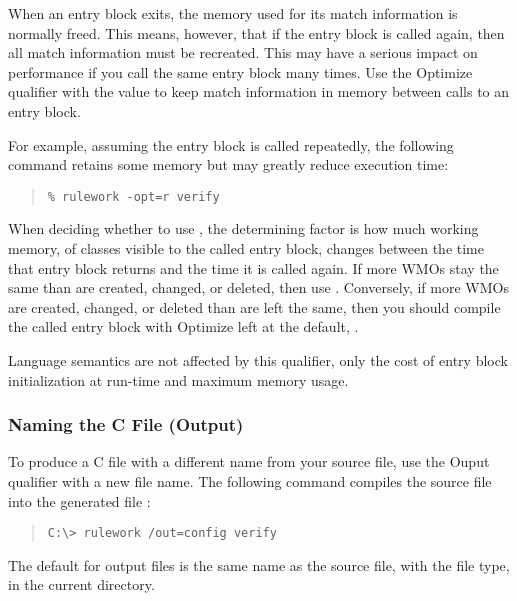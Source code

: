When an entry block exits, the memory used for its match information
is normally freed. This means, however, that if the entry block is
called again, then all match information must be recreated. This may
have a serious impact on performance if you call the same entry block
many times. Use the Optimize qualifier with the 
value to keep match information in memory between calls to an entry
block.

For example, assuming the entry block  is called
repeatedly, the following command retains some memory but
may greatly reduce execution time:

\begin{quote}
\begin{verbatim}
% rulework -opt=r verify
\end{verbatim}
\end{quote}

When deciding whether to use , the determining factor
is how much working memory, of classes visible to the called entry
block, changes between the time that entry block returns and the time
it is called again. If more WMOs stay the same than are created,
changed, or deleted, then use . Conversely, if more WMOs
are created, changed, or deleted than are left the same, then you
should compile the called entry block with Optimize left at the
default, .

\begin{note}
  Language semantics are not affected by this qualifier, only the cost
  of entry block initialization at run-time and maximum memory usage.
\end{note}

\subsubsection{Naming the C File (Output)}

To produce a C file with a different name from your source file, use
the Ouput qualifier with a new file name. The following command
compiles the source file  into the generated file
:

\begin{quote}
\begin{verbatim}
C:\> rulework /out=config verify
\end{verbatim}
\end{quote}  

The default for output files is the same name as the
source file, with the  file type, in the current
directory.

